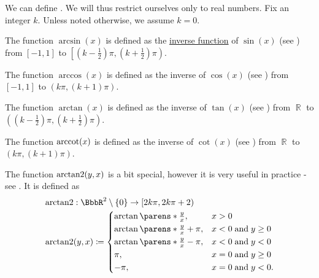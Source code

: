 \begin{definition}\label{def:inverse_trigonometric_functions}
  We can define . We will thus restrict ourselves only to real numbers. Fix an integer \( k \). Unless noted otherwise, we assume \( k = 0 \).

  \begin{thmenum}
     The  function \( \arcsin(x) \) is defined as the \hyperref[def:multi_valued_function/inverse]{inverse function} of \( \sin(x) \) (see ) from \( [-1, 1] \) to \( \left[(k - \tfrac 1 2) \pi, (k + \tfrac 1 2) \pi \right) \).

     The  function \( \arccos(x) \) is defined as the inverse of \( \cos(x) \) (see ) from \( [-1, 1] \) to \( (k\pi, (k + 1)\pi) \).

     The  function \( \arctan(x) \) is defined as the inverse of \( \tan(x) \) (see ) from \( \BbbR \) to \( \left((k - \tfrac 1 2) \pi, (k + \tfrac 1 2) \pi \right) \).

     The  function \( \operatorname{arccot}(x) \) is defined as the inverse of \( \cot(x) \) (see ) from \( \BbbR \) to \( (k\pi, (k + 1)\pi) \).

     The  function \( \operatorname{arctan2}(y, x) \) is a bit special, however it is very useful in practice - see . It is defined as
    \begin{align*}
       &\arctantwo: \BbbR^2 \setminus \{ 0 \} \to [2k\pi, 2k\pi + 2)  \\
       &\arctantwo(y, x) \coloneqq \begin{dcases}
        \arctan \parens*{ \tfrac y x },       &x > 0                  \\
        \arctan \parens*{ \tfrac y x } + \pi, &x < 0 \T{and} y \geq 0 \\
        \arctan \parens*{ \tfrac y x } - \pi, &x < 0 \T{and} y < 0    \\
        \pi,                                 &x = 0 \T{and} y \geq 0 \\
        -\pi,                                &x = 0 \T{and} y < 0.
      \end{dcases}
    \end{align*}
  \end{thmenum}
\end{definition}

